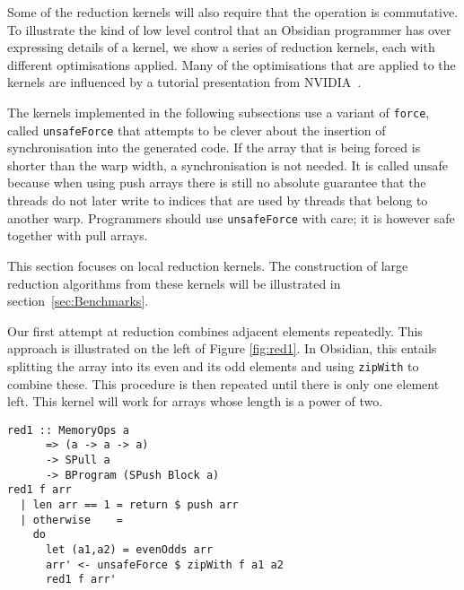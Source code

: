 
Some of the reduction 
kernels will also require that the operation is commutative. 
To illustrate the kind of low level control that an 
Obsidian programmer has over expressing details of a kernel, we show a series 
of reduction kernels, each with different optimisations applied. Many of the 
optimisations that are applied to the kernels are influenced by a 
tutorial presentation from NVIDIA~.



The kernels implemented in the following subsections use a variant of {\tt force}, 
called {\tt unsafeForce} that attempts to be clever about the insertion 
of synchronisation into the generated code. If the array that is being forced 
is shorter than the warp width, a synchronisation is not needed. It is called 
unsafe because when using push arrays there is still no absolute guarantee 
that the threads do not later write to indices that are used by threads that belong to another 
warp. Programmers should use {\tt unsafeForce} with care; it 
is however safe together with pull arrays. 

This section focuses on local reduction kernels. The construction of large 
reduction algorithms from these kernels will be illustrated in 
section~\ref{sec:Benchmarks}. 


Our first attempt at reduction combines adjacent elements repeatedly.
This approach is illustrated on the left of Figure \ref{fig:red1}. 
In Obsidian, this entails splitting the array into its even and its odd elements and using {\tt zipWith} to combine these. 
This procedure is then repeated until there is only one element left. This 
kernel will work for arrays whose length is a power of two. 

\begin{small} 
\begin{Verbatim}[samepage = true] 
red1 :: MemoryOps a
      => (a -> a -> a)
      -> SPull a
      -> BProgram (SPush Block a)
red1 f arr
  | len arr == 1 = return $ push arr
  | otherwise    = 
    do
      let (a1,a2) = evenOdds arr
      arr' <- unsafeForce $ zipWith f a1 a2
      red1 f arr'   
\end{Verbatim}
\end{small}

